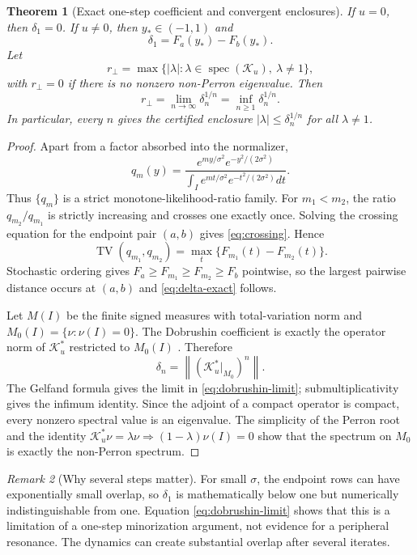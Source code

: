 \documentclass[11pt]{article}
\newtheorem{theorem}{Theorem}[section]
\theoremstyle{definition}
\theoremstyle{remark}
\newtheorem{remark}[theorem]{Remark}
\newcommand{\cK}{\mathcal K}
\newcommand{\spec}{\operatorname{spec}}
\newcommand{\TV}{\operatorname{TV}}
\newcommand{\norm}[1]{\left\lVert #1\right\rVert}
\begin{document}
\begin{theorem}[Exact one-step coefficient and convergent enclosures]
\label{thm:dobrushin}
If $u=0$, then $\delta_1=0$.  If $u\ne0$, then $y_*\in(-1,1)$ and
\begin{equation}\label{eq:delta-exact}
 \delta_1=F_a(y_*)-F_b(y_*).
\end{equation}
Let
\begin{equation}\label{eq:rperp}
 r_\perp=\max\{|\lambda|:\lambda\in\spec(\cK_u),\ \lambda\ne1\},
\end{equation}
with $r_\perp=0$ if there is no nonzero non-Perron eigenvalue.  Then
\begin{equation}\label{eq:dobrushin-limit}
 r_\perp
 =\lim_{n\to\infty}\delta_n^{1/n}
 =\inf_{n\ge1}\delta_n^{1/n}.
\end{equation}
In particular, every $n$ gives the certified enclosure
$|\lambda|\le\delta_n^{1/n}$ for all $\lambda\ne1$.
\end{theorem}

\begin{proof}
Apart from a factor absorbed into the normalizer,
\[
 q_m(y)=\frac{e^{my/\sigma^2}e^{-y^2/(2\sigma^2)}}
 {\int_Ie^{mt/\sigma^2}e^{-t^2/(2\sigma^2)}dt}.
\]
Thus $\{q_m\}$ is a strict monotone-likelihood-ratio family.  For $m_1<m_2$,
the ratio $q_{m_2}/q_{m_1}$ is strictly increasing and crosses one exactly
once.  Solving the crossing equation for the endpoint pair $(a,b)$ gives
\eqref{eq:crossing}.  Hence
\[
 \TV(q_{m_1},q_{m_2})
 =\max_t\{F_{m_1}(t)-F_{m_2}(t)\}.
\]
Stochastic ordering gives $F_a\ge F_{m_1}\ge F_{m_2}\ge F_b$ pointwise, so
the largest pairwise distance occurs at $(a,b)$ and
\eqref{eq:delta-exact} follows.

Let $M(I)$ be the finite signed measures with total-variation norm and
$M_0(I)=\{\nu:\nu(I)=0\}$.  The Dobrushin coefficient is exactly the operator
norm of $\cK_u^*$ restricted to $M_0(I)$ \citep{Seneta2006}.  Therefore
\[
 \delta_n=\norm{(\cK_u^*|_{M_0})^n}.
\]
The Gelfand formula gives the limit in \eqref{eq:dobrushin-limit};
submultiplicativity gives the infimum identity.  Since the adjoint of a compact
operator is compact, every nonzero spectral value is an eigenvalue.  The
simplicity of the Perron root and the identity
$\cK_u^*\nu=\lambda\nu\Rightarrow(1-\lambda)\nu(I)=0$ show that the spectrum on
$M_0$ is exactly the non-Perron spectrum.
\end{proof}

\begin{remark}[Why several steps matter]
For small $\sigma$, the endpoint rows can have exponentially small overlap,
so $\delta_1$ is mathematically below one but numerically indistinguishable
from one.  Equation \eqref{eq:dobrushin-limit} shows that this is a limitation
of a one-step minorization argument, not evidence for a peripheral resonance.
The dynamics can create substantial overlap after several iterates.
\end{remark}
\end{document}
